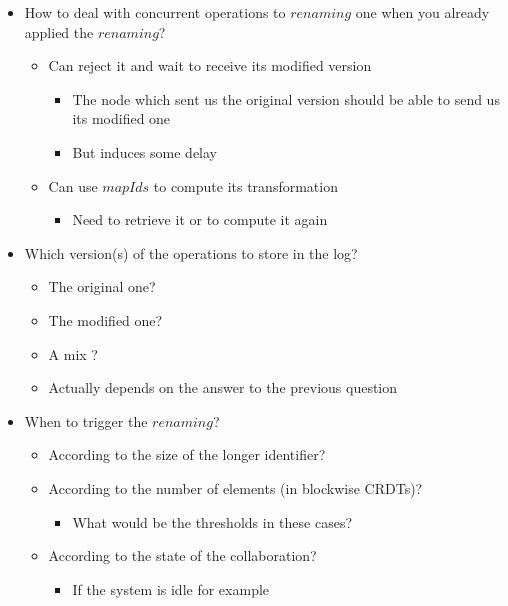 \documentclass[a4paper]{article}
\begin{document}
\begin{itemize}
  \item How to deal with concurrent operations to $renaming$ one when you already applied the $renaming$?
  \begin{itemize}
    \item Can reject it and wait to receive its modified version
    \begin{itemize}
      \item The node which sent us the original version should be able to send us its modified one
      \item But induces some delay
    \end{itemize}
    \item Can use $mapIds$ to compute its transformation
    \begin{itemize}
      \item Need to retrieve it or to compute it again
    \end{itemize}
  \end{itemize}
  \item Which version(s) of the operations to store in the log?
  \begin{itemize}
    \item The original one?
    \item The modified one?
    \item A mix ?
    \item Actually depends on the answer to the previous question
  \end{itemize}
  \item When to trigger the $renaming$?
  \begin{itemize}
    \item According to the size of the longer identifier?
    \item According to the number of elements (in blockwise \acp{CRDT})?
    \begin{itemize}
      \item What would be the thresholds in these cases?
    \end{itemize}
    \item According to the state of the collaboration?
    \begin{itemize}
      \item If the system is idle for example
    \end{itemize}
  \end{itemize}
\end{itemize}


\end{document}
